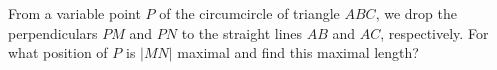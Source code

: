 From a variable point $P$ of the circumcircle of triangle $ABC$, we drop the perpendiculars $PM$ and $PN$ to the straight lines $AB$ and $AC$, respectively. For what position of $P$ is $|MN|$ maximal and find this maximal length?
